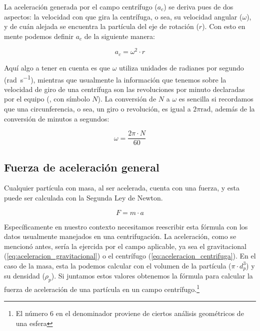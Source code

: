\documentclass{AsignaturaResumen}
\begin{document}
La aceleración generada por el campo centrífugo ($a_{c}$) se deriva pues de dos aspectos: la velocidad con que gira la centrífuga, o sea, su velocidad angular ($\omega$), y de cuán alejada se encuentra la partícula del eje de rotación ($r$). Con esto en mente podemos definir $a_{c}$ de la siguiente manera: 

\begin{equation}\label{eq:aceleracion_centrifuga}
    a_{c} = \omega^{2} \cdot r
\end{equation}

Aquí algo a tener en cuenta es que $\omega$ utiliza unidades de radianes por segundo (\unit{\radian\per\s}), mientras que usualmente la información que tenemos sobre la velocidad de giro de una centrífuga son las revoluciones por minuto declaradas por el equipo (\unit{\rpm}, con símbolo $N$). La conversión de $N$ a $\omega$ es sencilla si recordamos que una circunferencia, o sea, un giro o revolución, es igual a $2\pi\unit{\radian}$, además de la conversión de minutos a segundos:


\begin{equation}\label{eq:velocidad_angular}
    \omega = \frac{2\pi \cdot N}{60}
\end{equation}



\subsection{Fuerza de aceleración general}

Cualquier partícula con masa, al ser acelerada, cuenta con una fuerza, y esta puede ser calculada con la Segunda Ley de Newton.

\begin{equation}\label{eq:segunda_ley_de_newton}
    F = m \cdot a
\end{equation}

Específicamente en nuestro contexto necesitamos reescribir esta fórmula con los datos usualmente manejados en una centrifugación. La aceleración, como se mencionó antes, sería la ejercida por el campo aplicable, ya sea el gravitacional (\autoref{eq:aceleracion_gravitacional}) o el centrífugo (\autoref{eq:aceleracion_centrifuga}). En el caso de la masa, esta la podemos calcular con el volumen de la partícula ($\pi \cdot d_{p}^{3}$) y su densidad ($\rho_{p}$). Si juntamos estos valores obtenemos la fórmula para calcular la fuerza de aceleración de una partícula en un campo centrífugo.\footnote{El número 6 en el denominador proviene de ciertos análisis geométricos de una esfera}  
\end{document}
